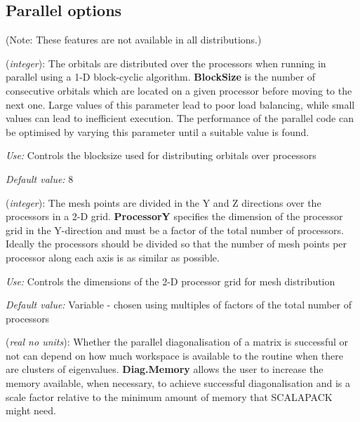 \documentclass[11pt]{article}
\begin{document}
\vspace{5pt}
\subsection{Parallel options}

(Note: These features are not available in all distributions.)

\begin{description}
\itemsep 10pt
\parsep 0pt

\item[{\bf BlockSize}] ({\it integer}):  The orbitals are distributed over the processors when
running in parallel using a 1-D block-cyclic algorithm. {\bf
BlockSize} is the number of consecutive orbitals which are located on
a given processor before moving to the next one. Large values of this
parameter lead to poor load balancing, while small values can lead to
inefficient execution.  The performance of the parallel code can be
optimised by varying this parameter until a suitable value is found.

{\it Use:} Controls the blocksize used for distributing orbitals over
processors

{\it Default value:}  8

\item[{\bf ProcessorY}] ({\it integer}):  The mesh points are divided in the Y and Z directions
over the processors in a 2-D grid. {\bf ProcessorY} specifies the
dimension of the processor grid in the Y-direction and must be a
factor of the total number of processors. Ideally the processors
should be divided so that the number of mesh points per processor
along each axis is as similar as possible.

{\it Use:} Controls the dimensions of the 2-D processor grid for mesh
distribution

{\it Default value:} Variable - chosen using multiples of factors of
  the total number of processors

\item[{\bf Diag.Memory}] ({\it real no units}):
Whether the parallel diagonalisation of a matrix is successful or not can 
depend on how much workspace is available to the routine when there are
clusters of eigenvalues. {\bf Diag.Memory} allows the user to increase
the memory available, when necessary, to achieve successful diagonalisation
and is a scale factor relative to the minimum amount of memory that
SCALAPACK might need. 


\end{description}
\end{document}
